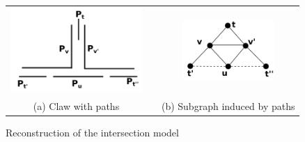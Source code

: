
\begin{figure}[h]
  \centering
  \begin{tabular}{  c p{0.7cm} c}
    \includegraphics[width=5cm]{img/clawGrid} & &
    \includegraphics[width=3.5cm]{img/clawInduced.png}
    \\
    \footnotesize %
    (a)  \footnotesize Claw with paths && \footnotesize (b) Subgraph induced by paths\\
  \end{tabular}

 \caption{Reconstruction of the intersection model}
 \label{fig:clawGrid}
\end{figure} 

 
